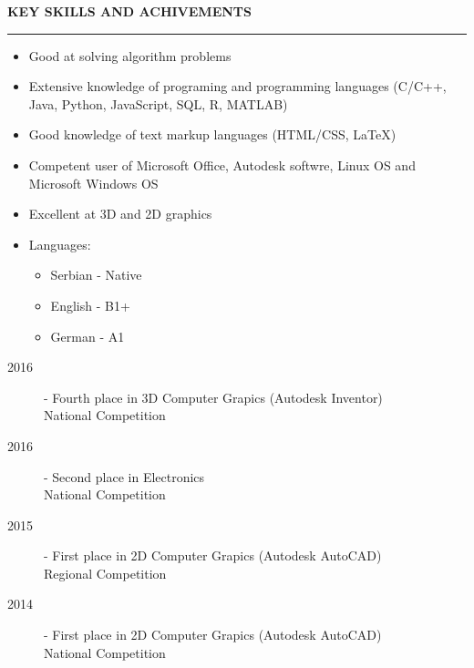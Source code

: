 \documentclass{article}
\begin{document}
\textbf{\large KEY SKILLS AND ACHIVEMENTS}\\
\color{my_col}\noindent\rule{15.4cm}{0.6pt}\color{black}
\normalsize
\begin{itemize}
  \item Good at solving algorithm problems
  \item Extensive knowledge of programing and programming languages 
  (C/C++, Java, Python, JavaScript, SQL, R, MATLAB)
  \item Good knowledge of text markup languages (HTML/CSS, LaTeX)
  \item Competent user of Microsoft Office, Autodesk softwre, 
  Linux OS and Microsoft Windows OS
  \item Excellent at 3D and 2D graphics 
  \item Languages:
	\begin{itemize}	\small
		\item Serbian - Native
		\item English - B1+
		\item German - A1
	\end{itemize}
\end{itemize}

\begin{description}
    \item[ 2016] - Fourth place in 3D Computer Grapics (Autodesk Inventor)\\
    National Competition
    \item[ 2016] - Second place in Electronics\\
    National Competition
    \item[ 2015] - First place in 2D Computer Grapics (Autodesk AutoCAD)\\
    Regional Competition
    \item[ 2014] - First place in 2D Computer Grapics (Autodesk AutoCAD)\\
    National Competition
\end{description}
\end{document}
